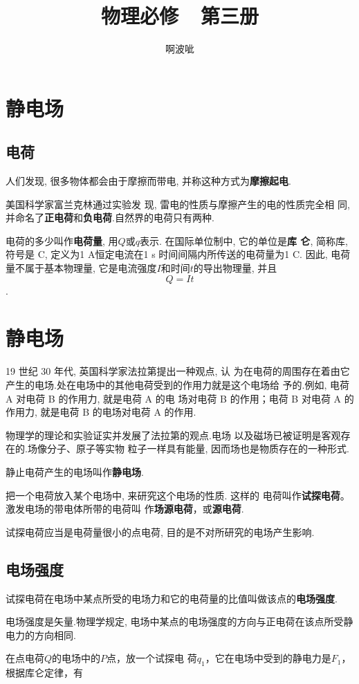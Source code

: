 \documentclass[12pt,a4paper]{ctexart}
\title{物理必修\ \ 第三册}
\author{啊波呲}
\newcounter{exam}[section]
\begin{document}
\maketitle
{}
\tableofcontents

\newpage
{}

\setlength{\abovedisplayskip}{3pt}
\setlength{\belowdisplayskip}{3pt}

\section{静电场}


\subsection{电荷}

人们发现, 很多物体都会由于摩擦而带电, 并称这种方式为\textbf{摩擦起电}.

美国科学家富兰克林通过实验发
现, 雷电的性质与摩擦产生的电的性质完全相
同, 并命名了\textbf{正电荷}和\textbf{负电荷}.自然界的电荷只有两种.

电荷的多少叫作\textbf{电荷量}, 用$Q$或$q$表示. 在国际单位制中, 它的单位是\textbf{库
    仑}, 简称库, 符号是 C, 定义为1 A恒定电流在1 s 时间间隔内所传送的电荷量为1 C. 因此,
电荷量不属于基本物理量, 它是电流强度$I$和时间$t$的导出物理量, 并且$$Q = It$$.

\section{静电场}

19 世纪 30 年代, 英国科学家法拉第提出一种观点, 认
为在电荷的周围存在着由它产生的电场.处在电场中的其他电荷受到的作用力就是这个电场给
予的.例如, 电荷 A 对电荷 B 的作用力, 就是电荷 A 的电
场对电荷 B 的作用；电荷 B 对电荷 A 的作用力, 就是电荷 B
的电场对电荷 A 的作用.

物理学的理论和实验证实并发展了法拉第的观点.电场
以及磁场已被证明是客观存在的.场像分子、原子等实物
粒子一样具有能量, 因而场也是物质存在的一种形式.

静止电荷产生的电场叫作\textbf{静电场}.

把一个电荷放入某个电场中, 来研究这个电场的性质. 这样的
电荷叫作\textbf{试探电荷}。激发电场的带电体所带的电荷叫
作\textbf{场源电荷}，或\textbf{源电荷}.

试探电荷应当是电荷量很小的点电荷, 目的是不对所研究的电场产生影响.

\subsection{电场强度}

试探电荷在电场中某点所受的电场力和它的电荷量的比值叫做该点的\textbf{电场强度}.

电场强度是矢量.物理学规定, 电场中某点的电场强度的方向与正电荷在该点所受静电力的方向相同.

在点电荷$Q$的电场中的$P$点，放一个试探电
荷$q_1$，它在电场中受到的静电力是$F_1$，根据库仑定律，有
\end{document}
